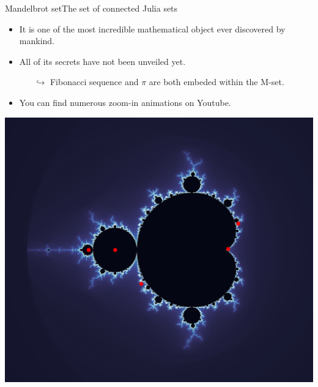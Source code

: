 \documentclass[usenames,dvipsnames,svgnames,10pt,aspectratio=169]{beamer}
\begin{document}
\begin{frame}[t, c]{Mandelbrot set}{The set of connected Julia sets}
	\begin{minipage}{.48\textwidth}
		\begin{itemize}
			\item It is one of the most incredible mathematical object ever discovered by mankind.
			\medskip
			\item All of its secrets have not been unveiled yet.
			\begin{itemize}
				\item[$\hookrightarrow$] Fibonacci sequence and $\pi$ are both embeded within the M-set.
			\end{itemize}
			\medskip
			\item You can find numerous zoom-in animations on Youtube.
		\end{itemize}
	\end{minipage}%
	\hfill
	\begin{minipage}{.48\textwidth}
		\centering
		\includegraphics[width=\columnwidth]{Mandelbrot_set_bis}
	\end{minipage}

	\vspace{1cm}
\end{frame}


\end{document}
